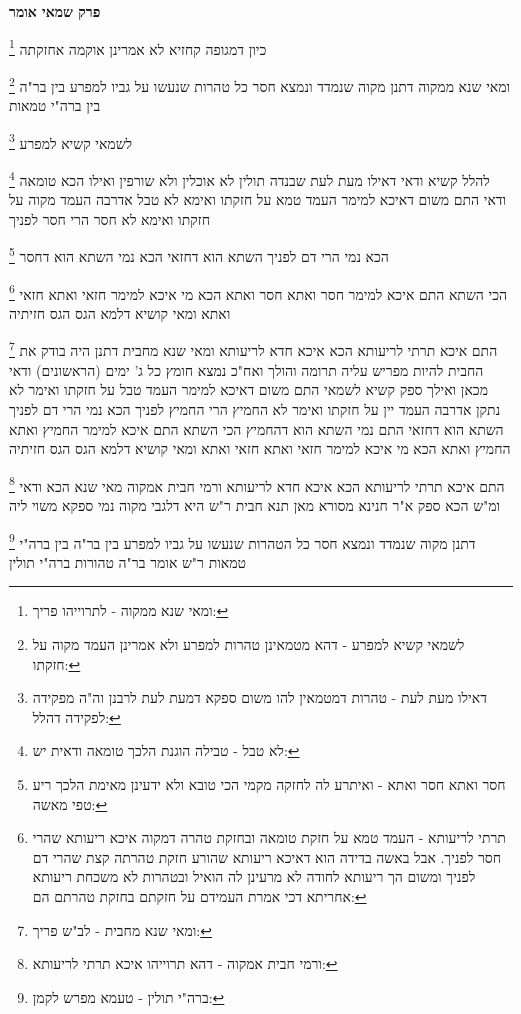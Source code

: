 \documentclass[12pt, openany]{book}
\newcommand{\sethebfont}{
\fontsize{10.5pt}{21.0pt} \selectfont
}
\newcommand{\twocol}[1]{
	{\sethebfont \begin{multicols}{2}
			#1
	\end{multicols}}	
}
\newcommand{\chapname}{}
\newcommand{\newchap}[1]{
	\addcontentsline{toc}{chapter}{#1}
	\renewcommand{\chapname}{#1}
		\begin{center}
			\textbf{%
\fontsize{16pt}{16pt}\selectfont
				#1}
		\end{center}
}
\newcommand{\footnotecomment}[1]{
	\renewcommand\thefootnote{}
	\footnote{#1}}
\newcommand{\commenta}[1]{\footnotecomment{#1}}
\begin{document}
\newchap{פרק  שמאי אומר}
\twocol{
\commenta{ומאי שנא ממקוה - לתרוייהו פריך:}
כיון דמגופה קחזיא לא אמרינן אוקמה אחזקתה 
\commenta{לשמאי קשיא למפרע - דהא מטמאינן טהרות למפרע ולא אמרינן העמד מקוה על חזקתו:}
ומאי שנא ממקוה דתנן מקוה שנמדד ונמצא חסר כל טהרות שנעשו על גביו למפרע בין בר"ה בין ברה"י טמאות 
\commenta{דאילו מעת לעת - טהרות דמטמאין להו משום ספקא דמעת לעת לרבנן וה"ה מפקידה לפקידה דהלל:}
לשמאי קשיא למפרע 
\commenta{לא טבל - טבילה הוגנת הלכך טומאה ודאית יש:}
להלל קשיא ודאי דאילו מעת לעת שבנדה תולין לא אוכלין ולא שורפין ואילו הכא טומאה ודאי 
התם משום דאיכא למימר העמד טמא על חזקתו ואימא לא טבל אדרבה העמד מקוה על חזקתו ואימא לא חסר הרי חסר לפניך 
\commenta{חסר ואתא חסר ואתא - ואיתרע לה לחזקה מקמי הכי טובא ולא ידעינן מאימת הלכך ריע טפי מאשה:}
הכא נמי הרי דם לפניך השתא הוא דחזאי הכא נמי השתא הוא דחסר 
\commenta{תרתי לריעותא - העמד טמא על חזקת טומאה ובחזקת טהרה דמקוה איכא ריעותא שהרי חסר לפניך. אבל באשה בדידה הוא דאיכא ריעותא שהורע חזקת טהרתה קצת שהרי דם לפניך ומשום הך ריעותא לחודה לא מרעינן לה הואיל ובטהרות לא משכחת ריעותא אחריתא דכי אמרת העמידם על חזקתם בחזקת טהרתם הם:}
הכי השתא התם איכא למימר חסר ואתא חסר ואתא הכא מי איכא למימר חזאי ואתא חזאי ואתא ומאי קושיא דלמא הגס הגס חזיתיה 
\commenta{ומאי שנא מחבית - לב"ש פריך:}
התם איכא תרתי לריעותא הכא איכא חדא לריעותא 
ומאי שנא מחבית דתנן היה בודק את החבית להיות מפריש עליה תרומה והולך ואח"כ נמצא חומץ כל ג' ימים (הראשונים) ודאי
מכאן ואילך ספק קשיא לשמאי 
התם משום דאיכא למימר העמד טבל על חזקתו ואימר לא נתקן אדרבה העמד יין על חזקתו ואימר לא החמיץ 
הרי החמיץ לפניך הכא נמי הרי דם לפניך השתא הוא דחזאי התם נמי השתא הוא דהחמיץ 
הכי השתא התם איכא למימר החמיץ ואתא החמיץ ואתא הכא מי איכא למימר חזאי ואתא חזאי ואתא ומאי קושיא דלמא הגס הגס חזיתיה 
\commenta{ורמי חבית אמקוה - דהא תרוייהו איכא תרתי לריעותא:}
התם איכא תרתי לריעותא הכא איכא חדא לריעותא 
ורמי חבית אמקוה מאי שנא הכא ודאי ומ"ש הכא ספק 
א"ר חנינא מסורא מאן תנא חבית ר"ש היא דלגבי מקוה נמי ספקא משוי ליה 
\commenta{ברה"י תולין - טעמא מפרש לקמן:}
דתנן מקוה שנמדד ונמצא חסר כל הטהרות שנעשו על גביו למפרע בין בר"ה בין ברה"י טמאות 
ר"ש אומר בר"ה טהורות ברה"י תולין}
\end{document}
